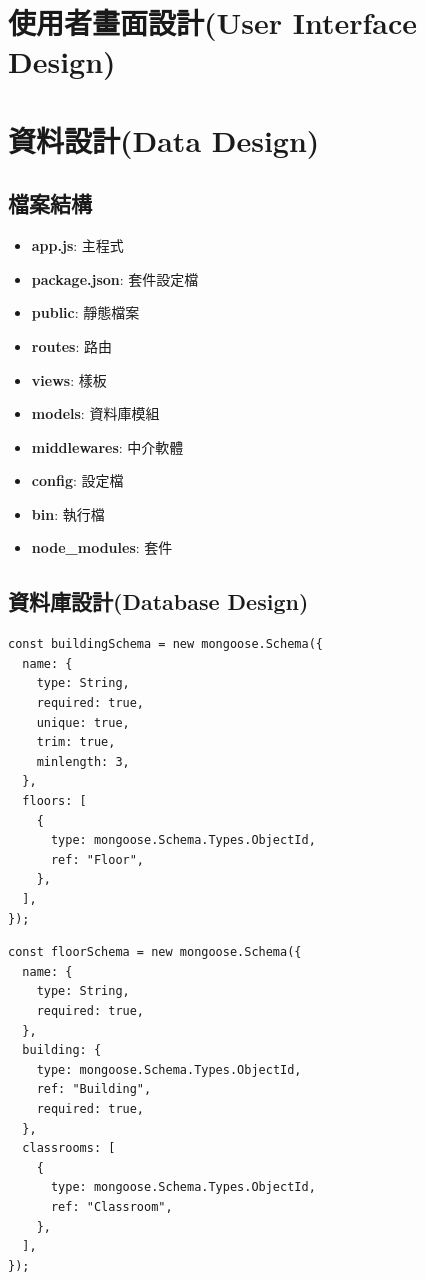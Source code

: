 \documentclass{article}
\begin{document}
\newpage

\section[使用者畫面設計(USER INTERFACE DESIGN)]{使用者畫面設計(User Interface Design)}

\newpage

\section[資料設計(DATA DESIGN)]{資料設計(Data Design)}

\subsection{檔案結構}

\begin{itemize}
	\item \textbf{app.js}: 主程式
	\item \textbf{package.json}: 套件設定檔
	\item \textbf{public}: 靜態檔案
	\item \textbf{routes}: 路由
	\item \textbf{views}: 樣板
	\item \textbf{models}: 資料庫模組
	\item \textbf{middlewares}: 中介軟體
	\item \textbf{config}: 設定檔
	\item \textbf{bin}: 執行檔
	\item \textbf{node\_modules}: 套件
\end{itemize}

\pagebreak

\subsection{資料庫設計(Database Design)}

\begin{center}
	\begin{verbatim}
const buildingSchema = new mongoose.Schema({
  name: {
    type: String,
    required: true,
    unique: true,
    trim: true,
    minlength: 3,
  },
  floors: [
    {
      type: mongoose.Schema.Types.ObjectId,
      ref: "Floor",
    },
  ],
});
\end{verbatim}
\end{center}

\begin{center}
	\begin{verbatim}
const floorSchema = new mongoose.Schema({
  name: {
    type: String,
    required: true,
  },
  building: {
    type: mongoose.Schema.Types.ObjectId,
    ref: "Building",
    required: true,
  },
  classrooms: [
    {
      type: mongoose.Schema.Types.ObjectId,
      ref: "Classroom",
    },
  ],
});
\end{verbatim}
\end{center}
\end{document}
